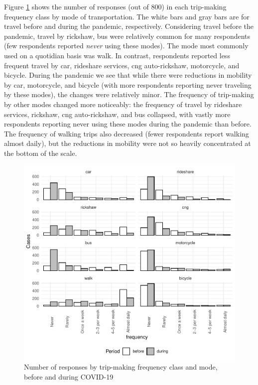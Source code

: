 \documentclass[]{elsarticle} %
\begin{document}
Figure \ref{fig:column-plot-cases} shows the number of responses (out of
800) in each trip-making frequency class by mode of transportation. The
white bars and gray bars are for travel before and during the pandemic,
respectively. Considering travel before the pandemic, travel by
rickshaw, bus were relatively common for many respondents (few
respondents reported \emph{never} using these modes). The mode most
commonly used on a quotidian basis was walk. In contrast, respondents
reported less frequent travel by car, rideshare services, cng
auto-rickshaw, motorcycle, and bicycle. During the pandemic we see that
while there were reductions in mobility by car, motorcycle, and bicycle
(with more respondents reporting never traveling by these modes), the
changes were relatively minor. The frequency of trip-making by other
modes changed more noticeably: the frequency of travel by rideshare
services, rickshaw, cng auto-rickshaw, and bus collapsed, with vastly
more respondents reporting never using these modes during the pandemic
than before. The frequency of walking trips also decreased (fewer
respondents report walking almost daily), but the reductions in mobility
were not so heavily concentrated at the bottom of the scale.

\begin{figure}
\centering
\includegraphics{Frequency-of-Travel-by-Mode-COVID-19-Bangladesh_files/figure-latex/column-plot-cases-before-after-1.pdf}
\caption{\label{fig:column-plot-cases}Number of responses by trip-making
frequency class and mode, before and during COVID-19}
\end{figure}
\end{document}
